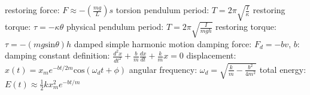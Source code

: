 \documentclass[10pt,landscape]{article}
\newcommand{\spc}{\hspace*{1em}}
\begin{document}
\begin{multicols}{3}
\spc restoring force: $F\approx -(\frac{mg}{L})s$
\newline \newline
torsion pendulum
\newline
\spc period: $T=2 \pi \sqrt{\frac{I}{\kappa }}$
\newline
\spc restoring torque: $\tau =-\kappa \theta $
\newline \newline
physical pendulum
\newline
\spc period: $T=2 \pi \sqrt{\frac{I}{mgh}}$
\newline
\spc restoring torque: $\tau =-(mg\mathrm{sin}\theta )h$
\newline \newline
damped simple harmonic motion
\newline
\spc damping force: $F_d=-bv$, $b$: damping constant
\newline
\spc definition: $\frac{d^2x}{dt^2}+\frac{b}{m}\frac{dx}{dt}+\frac{k}{m}x=0$
\newline
\spc \spc displacement: $x(t)=x_me^{-bt/2m}\mathrm{cos}(\omega _dt+ \phi)$
\newline
\spc angular frequency: $\omega_d=\sqrt{\frac{k}{m}-\frac{b^2}{4m^2}}$
\newline
\spc total energy: $E(t)\approx \frac{1}{2}kx_m^2e^{-bt/m}$


\end{multicols}
\end{document}
